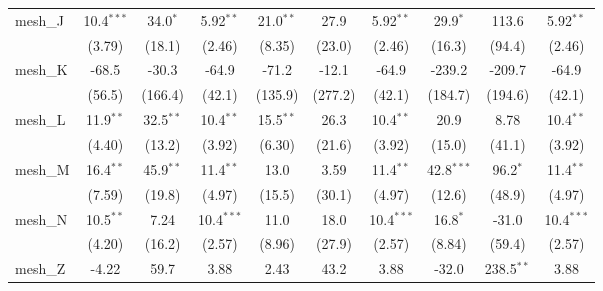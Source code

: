 \begin{tabular}{lccccccccc}
   mesh\_J                                                     & 10.4$^{***}$   & 34.0$^{*}$     & 5.92$^{**}$   & 21.0$^{**}$    & 27.9           & 5.92$^{**}$   & 29.9$^{*}$     & 113.6          & 5.92$^{**}$\\   
                                                               & (3.79)         & (18.1)         & (2.46)        & (8.35)         & (23.0)         & (2.46)        & (16.3)         & (94.4)         & (2.46)\\   
   mesh\_K                                                     & -68.5          & -30.3          & -64.9         & -71.2          & -12.1          & -64.9         & -239.2         & -209.7         & -64.9\\   
                                                               & (56.5)         & (166.4)        & (42.1)        & (135.9)        & (277.2)        & (42.1)        & (184.7)        & (194.6)        & (42.1)\\   
   mesh\_L                                                     & 11.9$^{**}$    & 32.5$^{**}$    & 10.4$^{**}$   & 15.5$^{**}$    & 26.3           & 10.4$^{**}$   & 20.9           & 8.78           & 10.4$^{**}$\\   
                                                               & (4.40)         & (13.2)         & (3.92)        & (6.30)         & (21.6)         & (3.92)        & (15.0)         & (41.1)         & (3.92)\\   
   mesh\_M                                                     & 16.4$^{**}$    & 45.9$^{**}$    & 11.4$^{**}$   & 13.0           & 3.59           & 11.4$^{**}$   & 42.8$^{***}$   & 96.2$^{*}$     & 11.4$^{**}$\\   
                                                               & (7.59)         & (19.8)         & (4.97)        & (15.5)         & (30.1)         & (4.97)        & (12.6)         & (48.9)         & (4.97)\\   
   mesh\_N                                                     & 10.5$^{**}$    & 7.24           & 10.4$^{***}$  & 11.0           & 18.0           & 10.4$^{***}$  & 16.8$^{*}$     & -31.0          & 10.4$^{***}$\\   
                                                               & (4.20)         & (16.2)         & (2.57)        & (8.96)         & (27.9)         & (2.57)        & (8.84)         & (59.4)         & (2.57)\\   
   mesh\_Z                                                     & -4.22          & 59.7           & 3.88          & 2.43           & 43.2           & 3.88          & -32.0          & 238.5$^{**}$   & 3.88\\   

\end{tabular}
